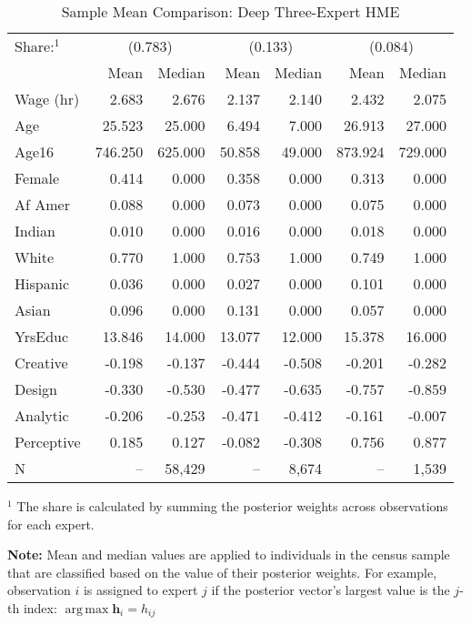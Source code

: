 \documentclass[12pt]{article}
\DeclareMathOperator*{\argmax}{arg\,max}
\begin{document}
  \begin{table} \centering
    \caption{Sample Mean Comparison: Deep Three-Expert HME}
    \begin{threeparttable}
      \begin{tabular}[l]{l r r r r r r}
    \cmidrule{1-7}
    Share:$^{1}$& \multicolumn{2}{c}{(0.783)} & \multicolumn{2}{c}{(0.133)} & \multicolumn{2}{c}{(0.084)} \\
                & Mean & Median & Mean & Median & Mean & Median \\
    \cmidrule{1-7}
    Wage (hr)   &   2.683 &   2.676 &  2.137 &  2.140 &   2.432 &   2.075 \\
    Age         &  25.523 &  25.000 &  6.494 &  7.000 &  26.913 &  27.000 \\
    Age16       & 746.250 & 625.000 & 50.858 & 49.000 & 873.924 & 729.000 \\
    Female      &   0.414 &   0.000 &  0.358 &  0.000 &   0.313 &   0.000 \\
    Af Amer     &   0.088 &   0.000 &  0.073 &  0.000 &   0.075 &   0.000 \\
    Indian      &   0.010 &   0.000 &  0.016 &  0.000 &   0.018 &   0.000 \\
    White       &   0.770 &   1.000 &  0.753 &  1.000 &   0.749 &   1.000 \\
    Hispanic    &   0.036 &   0.000 &  0.027 &  0.000 &   0.101 &   0.000 \\
    Asian       &   0.096 &   0.000 &  0.131 &  0.000 &   0.057 &   0.000 \\
    YrsEduc     &  13.846 &  14.000 & 13.077 & 12.000 &  15.378 &  16.000 \\
    Creative    &  -0.198 &  -0.137 & -0.444 & -0.508 &  -0.201 &  -0.282 \\
    Design      &  -0.330 &  -0.530 & -0.477 & -0.635 &  -0.757 &  -0.859 \\
    Analytic    &  -0.206 &  -0.253 & -0.471 & -0.412 &  -0.161 &  -0.007 \\
    Perceptive  &   0.185 &   0.127 & -0.082 & -0.308 &   0.756 &   0.877 \\
    \cmidrule{1-7}
    N           &      -- &  58,429 &     -- &  8,674 &      -- &   1,539 \\
    \hline
      \end{tabular}
      \begin{tablenotes}
        \item{\footnotesize $^{1}$ The share is calculated by summing the 
        posterior weights across observations for each expert.}
        \item{\footnotesize \textbf{Note:} Mean and median values are applied to individuals
        in the census sample that are classified based on the value of their posterior weights.
        For example, observation $i$ is assigned to expert $j$ if the posterior vector's
        largest value is the $j$-th index: $\argmax \boldsymbol{h}_{i} = h_{ij}$}
      \end{tablenotes} \label{tbl:HME3_sample_comparison}
    \end{threeparttable}
  \end{table}


\printbibliography
\end{document}
